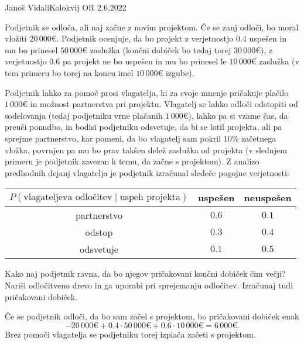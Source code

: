 \begin{naloga}{Janoš Vidali}{Kolokvij OR 2.6.2022}
\begin{vprasanje}
Podjetnik se odloča, ali naj začne z novim projektom.
Če se zanj odloči, bo moral vložiti $20\,000 €$.
Podjetnik ocenjuje,
da bo projekt z verjetnostjo $0.4$ uspešen
in mu bo prinesel $50\,000 €$ zaslužka
(končni dobiček bo tedaj torej $30\,000 €$),
z verjetnostjo $0.6$ pa projekt ne bo uspešen
in mu bo prinesel le $10\,000 €$ zaslužka
(v tem primeru bo torej na koncu imel $10\,000 €$ izgube).

Podjetnik lahko za pomoč prosi vlagatelja,
ki za svoje mnenje pričakuje plačilo $1\,000 €$
in mož\-nost partnerstva pri projektu.
Vlagatelj se lahko odloči odstopiti od sodelovanja
(tedaj podjetniku vrne plačanih $1\,000 €$),
lahko pa si vzame čas, da preuči ponudbo,
in bodisi podjetniku odsvetuje, da bi se lotil projekta,
ali pa sprejme partnerstvo, kar pomeni,
da bo vlagatelj sam pokril $10\%$ začetnega vložka,
povrnjen pa mu bo prav takšen delež zaslužka od projekta
(v slednjem primeru je podjetnik zavezan k temu, da začne s projektom).
Z analizo predhodnih dejanj vlagatelja
je podjetnik izračunal sledeče pogojne verjetnosti:
\begin{center}
\begin{tabular}{c|cc}
$P(\text{vlagateljeva odločitev} \mid \text{uspeh projekta})$
& uspešen & neuspešen \\ \hline
partnerstvo & $0.6$ & $0.1$ \\
odstop & $0.3$ & $0.4$ \\
odsvetuje & $0.1$ & $0.5$
\end{tabular}
\end{center}
Kako naj podjetnik ravna, da bo njegov pričakovani končni dobiček čim večji?
Nariši odločitveno drevo in ga uporabi pri sprejemanju odločitev.
Izračunaj tudi pričakovani dobiček.
\end{vprasanje}

\begin{odgovor}
Če se podjetnik odloči, da bo sam začel s projektom,
bo pričakovani dobiček enak
$$
-20\,000 € + 0.4 \cdot 50\,000 € + 0.6 \cdot 10\,000 € = 6\,000 €.
$$
Brez pomoči vlagatelja
se podjetniku torej izplača začeti s projektom.


\end{odgovor}
\end{naloga}
